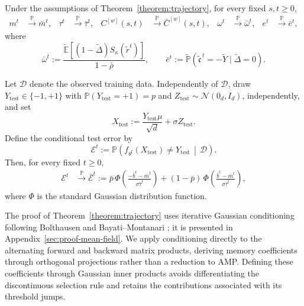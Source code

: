 \begin{corollary}
\label{cor:mean-field-observables}
Under the assumptions of Theorem~\ref{theorem:trajectory}, for every
fixed $s,t\geq0$,
\begin{align}
    m^t
    &\xrightarrow{\mathbb P}\bar m^t,
    &
    \tau^t
    &\xrightarrow{\mathbb P}\bar\tau^t,
    &
    C^{[w]}(s,t)
    &\xrightarrow{\mathbb P}\bar C^{[w]}(s,t),
    &
    \omega^t
    &\xrightarrow{\mathbb P}\bar\omega^t,
    &
    e^t
    &\xrightarrow{\mathbb P}\bar e^t,
    \label{eq:mean-field-observable-convergence}
\end{align}
where
\[
    \bar\omega^t
    :=
    \frac{
        \tilde{\mathbb E}
        [(1-\tilde\Delta)S_\kappa(\tilde r^t)]
    }{1-\bar\rho},
    \qquad
    \bar e^t
    :=\tilde{\mathbb P}
        (\tilde{\mathfrak c}^{\,t}=-\tilde Y\mid\tilde\Delta=0).
\]

Let $\mathcal D$ denote the observed training data.
Independently of $\mathcal D$, draw
$Y_{\mathrm{test}}\in\{-1,+1\}$ with
$\mathbb P(Y_{\mathrm{test}}=+1)=p$ and
$Z_{\mathrm{test}}\sim\mathcal N(0_d,I_d)$, independently, and set
\[
    X_{\mathrm{test}}
    :=\frac{Y_{\mathrm{test}}\mu}{\sqrt d}+\sigma Z_{\mathrm{test}}.
\]
Define the conditional test error by
\[
    \mathcal E^t
    :=\mathbb P\!\left(
        f_{\theta^t}(X_{\mathrm{test}})\neq Y_{\mathrm{test}}
        \,\middle|\,\mathcal D
    \right).
\]
Then, for every fixed $t\geq0$,
\begin{align}
    \mathcal E^t
    &\xrightarrow{\mathbb P}
    \bar{\mathcal E}^t
    :=
    \bar p\,
    \Phi\left(
        \frac{-\bar b^t-\bar m^t}{\sigma\bar\tau^t}
    \right)
    +
    (1-\bar p)\,
    \Phi\left(
        \frac{\bar b^t-\bar m^t}{\sigma\bar\tau^t}
    \right),
    \label{eq:mean-field-classification-error}
\end{align}
where $\Phi$ is the standard Gaussian distribution function.
\end{corollary}

The proof of Theorem~\ref{theorem:trajectory} uses iterative
Gaussian conditioning following
Bolthausen and Bayati--Montanari
\cite{bolthausen2014,bayati2011dynamics};
it is presented in Appendix~\ref{sec:proof-mean-field}.
We apply conditioning directly to the alternating forward
and backward matrix products, deriving memory coefficients
through orthogonal projections rather than a
reduction to AMP. 
Defining these coefficients through Gaussian inner products
avoids differentiating the discontinuous selection rule and
retains the contributions associated with its threshold jumps.

